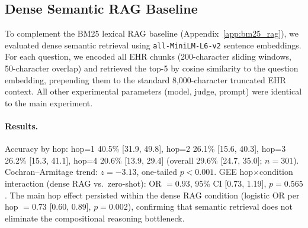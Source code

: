 \documentclass{article}
\begin{document}
\subsection{Dense Semantic RAG Baseline}
\label{app:dense_rag}

To complement the BM25 lexical RAG baseline (Appendix~\ref{app:bm25_rag}), we evaluated dense semantic retrieval using \texttt{all-MiniLM-L6-v2} sentence embeddings. For each question, we encoded all EHR chunks (200-character sliding windows, 50-character overlap) and retrieved the top-5 by cosine similarity to the question embedding, prepending them to the standard 8,000-character truncated EHR context. All other experimental parameters (model, judge, prompt) were identical to the main experiment.

\paragraph{Results.}
Accuracy by hop: hop=1 40.5\% [31.9, 49.8], hop=2 26.1\% [15.6, 40.3], hop=3 26.2\% [15.3, 41.1], hop=4 20.6\% [13.9, 29.4] (overall 29.6\% [24.7, 35.0]; $n = 301$). Cochran--Armitage trend: $z = -3.13$, one-tailed $p < 0.001$. GEE hop$\times$condition interaction (dense RAG vs.\ zero-shot): OR $= 0.93$, 95\% CI [0.73, 1.19], $p = 0.565$. The main hop effect persisted within the dense RAG condition (logistic OR per hop $= 0.73$ [0.60, 0.89], $p = 0.002$), confirming that semantic retrieval does not eliminate the compositional reasoning bottleneck.
\end{document}
